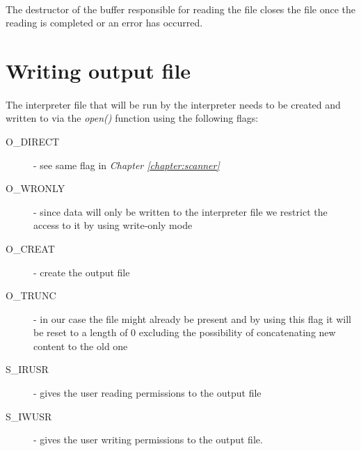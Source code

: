   	\paragraph{}
		The destructor of the buffer responsible for reading the file closes the file once the reading is completed or an error has occurred.
    		
	\section{Writing output file}
	\paragraph{}
		The interpreter file that will be run by the interpreter needs to be created and written to via the \textit{open()} function using the following flags:
  		\begin{description}
  			\item[O\_DIRECT] - see same flag in \textit{Chapter \ref{chapter:scanner}}
  			\item[O\_WRONLY] - since data will only be written to the interpreter file we restrict the access to it by using write-only mode
  			\item[O\_CREAT] - create the output file
  			\item[O\_TRUNC] - in our case the file might already be present and by using this flag it will be reset to a length of 0 excluding the possibility of concatenating new content to the old one
  			\item[S\_IRUSR] - gives the user reading permissions to the output file
  			\item[S\_IWUSR] - gives the user writing permissions to the output file.
  		\end{description}